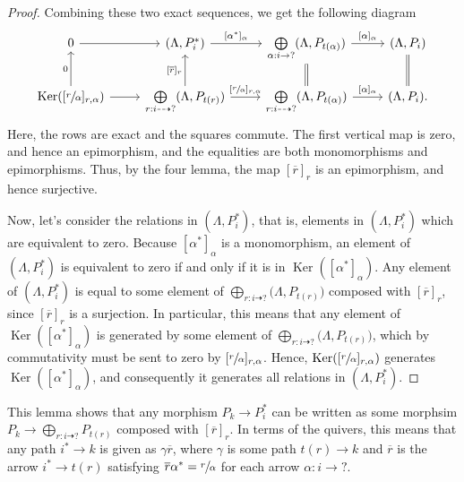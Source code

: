 \documentclass[12pt, dvipsnames, oneside]{amsart}
\DeclareMathOperator{\Ker}{Ker}
\theoremstyle{definition}
\begin{document}
\begin{proof}
Combining these two exact sequences, we get the following diagram
\begin{equation*}
\begin{tikzcd}
0 \arrow[r] & (\Lambda, P_i^*) \arrow[r, "{[\alpha^*]_{\alpha}}"]  & \bigoplus\limits_{\alpha:i\rightarrow ?}(\Lambda, P_{t(\alpha)})  \arrow[r, "{[\alpha]_{\alpha}}"] & (\Lambda, P_i)\\
\Ker([\sfrac{r}{\alpha}]_{r,\alpha}) \arrow[r] \arrow[u, "0"] & \bigoplus\limits_{r:i\dashrightarrow ?} (\Lambda, P_{t(r)}) \arrow[r, "{[\sfrac{r}{\alpha}]_{r,\alpha}}"] \arrow[u, "{[\overline{r}]_r}"] & \bigoplus\limits_{r:i\dashrightarrow ?} (\Lambda, P_{t(\alpha)}) \arrow[u, equals] \arrow[r, "{[\alpha]_\alpha}"]& (\Lambda, P_i). \arrow[u, equals]
\end{tikzcd}
\end{equation*}
Here, the rows are exact and the squares commute. The first vertical map is zero, and hence an epimorphism, and the equalities are both monomorphisms and epimorphisms. Thus, by the four lemma, the map $[\overline{r}]_r$ is an epimorphism, and hence surjective.



Now, let's consider the relations in $(\Lambda, P_i^*)$, that is, elements in $(\Lambda, P_i^*)$ which are equivalent to zero.
Because $[\alpha^*]_\alpha$ is a monomorphism, an element of $(\Lambda, P_i^*)$ is equivalent to zero if and only if it is in $\Ker([\alpha^*]_\alpha)$.
Any element of $(\Lambda,P_i^*)$ is equal to some element of $\bigoplus\limits_{r:i\dashrightarrow ?}\big(\Lambda, P_{t(r)}\big)$ composed with $[\overline{r}]_{r}$, since $[\overline{r}]_r$ is a surjection.
In particular, this means that any element of $\Ker([\alpha^*]_\alpha)$ is generated by some element of $\bigoplus\limits_{r:i\dashrightarrow ?}\big(\Lambda, P_{t(r)}\big)$, which by commutativity must be sent to zero by $[\sfrac{r}{\alpha}]_{r,\alpha}$. Hence, $\Ker([\sfrac{r}{\alpha}]_{r,\alpha})$ generates $\Ker([\alpha^*]_\alpha)$, and consequently it generates all relations in $(\Lambda, P_i^*)$.
\end{proof}


This lemma shows that any morphism $P_k\rightarrow P_i^*$ can be written as some morphsim  $P_k \rightarrow \bigoplus\limits_{r:i\dashrightarrow ?} P_{t(r)}$ composed with $[\overline{r}]_{r}$. In terms of the quivers, this means that any path $i^*\rightarrow k$ is given as $\gamma\overline{r}$, where $\gamma$ is some path $t(r)\rightarrow k$ and $\overline{r}$ is the arrow $i^*\rightarrow t(r)$ satisfying $\overline{r}\alpha^*=\sfrac{r}{\alpha}$ for each arrow $\alpha\colon i\rightarrow ?$.
\end{document}
